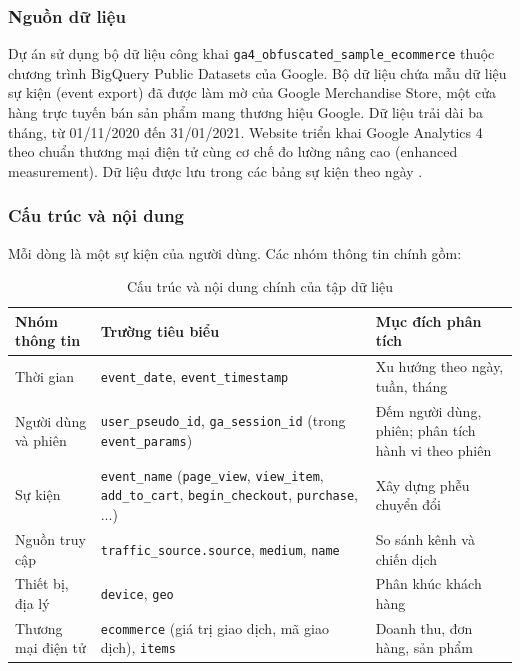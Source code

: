 \subsubsection{Nguồn dữ liệu}

Dự án sử dụng bộ dữ liệu công khai \texttt{ga4\_obfuscated\_sample\_ecommerce} thuộc chương trình BigQuery Public Datasets của Google. Bộ dữ liệu chứa mẫu dữ liệu sự kiện (event export) đã được làm mờ của Google Merchandise Store, một cửa hàng trực tuyến bán sản phẩm mang thương hiệu Google. Dữ liệu trải dài ba tháng, từ 01/11/2020 đến 31/01/2021. Website triển khai Google Analytics 4 theo chuẩn thương mại điện tử cùng cơ chế đo lường nâng cao (enhanced measurement). Dữ liệu được lưu trong các bảng sự kiện theo ngày \parencite{ga4-export-schema}.

\subsubsection{Cấu trúc và nội dung}

Mỗi dòng là một sự kiện của người dùng. Các nhóm thông tin chính gồm:

\begin{table}[htbp]
    \centering
    \renewcommand{\arraystretch}{1.3}
    \caption{Cấu trúc và nội dung chính của tập dữ liệu}
    \label{tab:dataset_structure}
    \begin{tabular}{|p{2.8cm}|p{6.2cm}|p{5cm}|}
        \hline
        \textbf{Nhóm thông tin} &
        \textbf{Trường tiêu biểu} &
        \textbf{Mục đích phân tích} \\
        \hline
        Thời gian &
        \texttt{event\_date}, \texttt{event\_timestamp} &
        Xu hướng theo ngày, tuần, tháng \\
        \hline
        Người dùng và phiên &
        \texttt{user\_pseudo\_id}, \texttt{ga\_session\_id} (trong \texttt{event\_params}) &
        Đếm người dùng, phiên; phân tích hành vi theo phiên \\
        \hline
        Sự kiện &
        \texttt{event\_name} (\texttt{page\_view}, \texttt{view\_item}, \texttt{add\_to\_cart}, \texttt{begin\_checkout}, \texttt{purchase}, ...) &
        Xây dựng phễu chuyển đổi \\
        \hline
        Nguồn truy cập &
        \texttt{traffic\_source.source}, \texttt{medium}, \texttt{name} &
        So sánh kênh và chiến dịch \\
        \hline
        Thiết bị, địa lý &
        \texttt{device}, \texttt{geo} &
        Phân khúc khách hàng \\
        \hline
        Thương mại điện tử &
        \texttt{ecommerce} (giá trị giao dịch, mã giao dịch), \texttt{items} &
        Doanh thu, đơn hàng, sản phẩm \\
        \hline
    \end{tabular}
\end{table}

